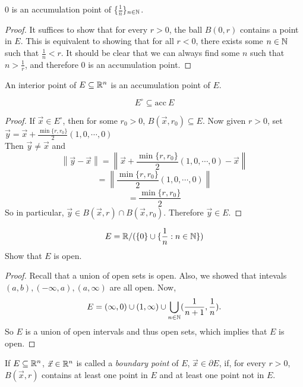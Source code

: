 \documentclass[11pt]{article}
\newcommand{\x}{\vec{x}}
\newcommand{\norm}[1]{\left\lVert #1 \right\rVert}
\newcommand{\y}{\vec{y}}
\begin{document}
\begin{example}
    $0$ is an accumulation point of \{$\frac{1}{n}$\}$_{n \in \mathbb{N}}$. 
    \begin{proof}
        It suffices to show that for every $r > 0$, the ball $B(0, r)$ contains a point in $E$. This is equivalent to showing that for all $r < 0$, there exists some $n \in \mathbb{N}$ such that $\frac{1}{n} < r$. It should be clear that we can always find some $n$ such that $n > \frac{1}{r}$, and therefore $0$ is an accumulation point. 
    \end{proof}
\end{example}
\begin{remark}
    An interior point of $E \subseteq \mathbb{R}^n$ is an accumulation point of $E$.
\end{remark}
\begin{example}
    \[E^\circ \subseteq \text{acc} \ E\]
    \begin{proof}
        If $\x \in E^\circ$, then for some $r_0 > 0$, $B(\x, r_0) \subseteq E$. Now given $r > 0$, set $\y = \x + \frac{\min\{r, r_0\}}{2} (1, 0, \cdots, 0)$ \\
        Then $\y \neq \x$ and \[\norm{\y - \x} = \norm{\x + \frac{\min\{r, r_0\}}{2}(1, 0, \cdots, 0) - \x }\]
        \[= \norm{\frac{\min\{r, r_0\}}{2}(1, 0, \cdots, 0)}\]
        \[= \frac{\min\{r, r_0\}}{2}\]
        So in particular, $\y \in B(\x, r) \cap B(\x, r_0)$. Therefore $\y \in E$. 
    \end{proof}
\end{example}

\begin{example}
    \[E = \mathbb{R} / (\{0\} \cup \{ \frac{1}{n}: n \in \mathbb{N} \})\]
    Show that $E$ is open. 
    \begin{proof}
        Recall that a union of open sets is open. Also, we showed that intevals $(a, b), (-\infty, a), (a, \infty)$ are all open. Now, \[E = (\infty, 0) \cup (1, \infty) \cup \bigcup_{n \in \mathbb{N}} (\frac{1}{n+1}, \frac{1}{n}).\]
        So $E$ is a union of open intervals and thus open sets, which implies that $E$ is open. 
    \end{proof}
\end{example}

\begin{definition}
    If $E \subseteq \mathbb{R}^n$, $\x \in \R^n$ is called a \textit{boundary point} of $E$, $\x \in \partial E$, if, for every $r > 0$, $B(\x,r)$ contains at least one point in $E$ and at least one point not in $E$. 
\end{definition}
\end{document}
